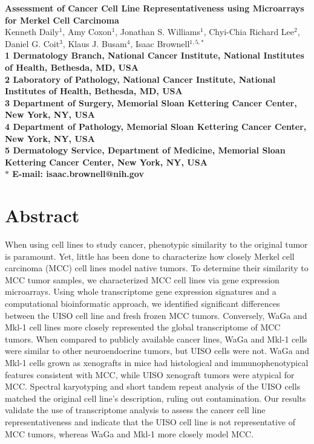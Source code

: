 \documentclass[10pt]{article}
\date{}
\begin{document}
\begin{singlespace}
\begin{flushleft}
{\Large 
\textbf{Assessment of Cancer Cell Line Representativeness using Microarrays for Merkel Cell Carcinoma}
}
\\
Kenneth Daily$^{1}$,
Amy Coxon$^{1}$,
Jonathan S. Williams$^{1}$,
Chyi-Chia Richard Lee$^{2}$,
Daniel G. Coit$^{3}$,
Klaus J. Busam$^{4}$,
Isaac Brownell$^{1,5,\ast}$
\\

\bf{1} Dermatology Branch, National Cancer Institute, National Institutes of Health, Bethesda, MD, USA
\\
\bf{2} Laboratory of Pathology, National Cancer Institute, National Institutes of Health, Bethesda, MD, USA
\\
\bf{3} Department of Surgery, Memorial Sloan Kettering Cancer Center, New York, NY, USA
\\
\bf{4} Department of Pathology, Memorial Sloan Kettering Cancer Center, New York, NY, USA
\\
\bf{5} Dermatology Service, Department of Medicine, Memorial Sloan Kettering Cancer Center, New York, NY, USA
\\

$\ast$ E-mail: isaac.brownell@nih.gov

\end{flushleft}

\end{singlespace}

\section*{Abstract}
When using cell lines to study cancer, phenotypic similarity to the original tumor is paramount.
Yet, little has been done to characterize how closely Merkel cell carcinoma (MCC) cell lines model native tumors.
To determine their similarity to MCC tumor samples, we characterized MCC cell lines via gene expression microarrays.
Using whole transcriptome gene expression signatures and a computational bioinformatic approach, we identified significant differences between the UISO cell line and fresh frozen MCC tumors.
Conversely, WaGa and Mkl-1 cell lines more closely represented the global transcriptome of MCC tumors.
When compared to publicly available cancer lines, WaGa and Mkl-1 cells were similar to other neuroendocrine tumors, but UISO cells were not.
WaGa and Mkl-1 cells grown as xenografts in mice had histological and immunophenotypical features consistent with MCC, while UISO xenograft tumors were atypical for MCC.
Spectral karyotyping and short tandem repeat analysis of the UISO cells matched the original cell line's description, ruling out contamination.
Our results validate the use of transcriptome analysis to assess the cancer cell line representativeness and indicate that the UISO cell line is not representative of MCC tumors, whereas WaGa and Mkl-1 more closely model MCC.
\end{document}
